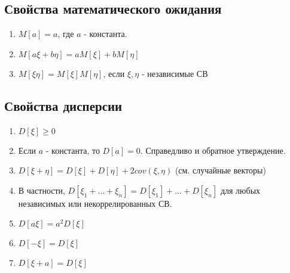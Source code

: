 \subsection{Свойства математического ожидания}
\begin{enumerate}
    \item $M[a] = a$, где $a$ -  константа.
    \item $M[a\xi + b\eta] = aM[\xi] + bM[\eta]$
    \item $M[\xi\eta] = M[\xi]M[\eta]$, если $\xi,\eta$ - независимые СВ
\end{enumerate}

\subsection{Свойства дисперсии}
\begin{enumerate}
    \item $D[\xi] \geq 0$
    \item Если $a$ - константа, то $D[a] = 0$. Справедливо и обратное утверждение.
    \item $D[\xi + \eta] = D[\xi] + D[\eta] + 2cov(\xi, \eta)$ (см. случайные векторы)
    \item В частности, $D[\xi_1 + \ldots + \xi_n] = D[\xi_1] + \ldots + D[\xi_n]$ для любых
          независимых или некоррелированных СВ.
    \item $D[a\xi] = a^2D[\xi]$
    \item $D[-\xi] = D[\xi]$
    \item $D[\xi + a] = D[\xi]$
\end{enumerate}
